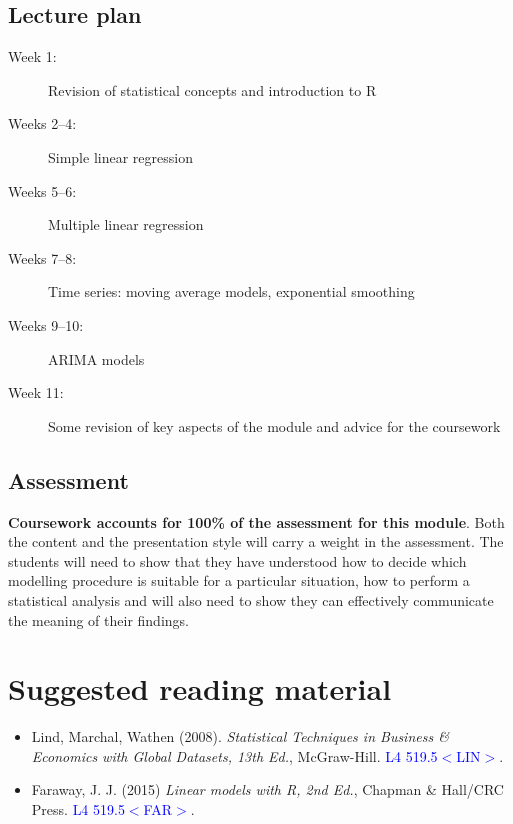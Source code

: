 \documentclass[12pt,a4paper,openany,twoside]{report}
\newcommand{\blue}{\textcolor{blue}}
\renewcommand{\emph}[1]{\textcolor{Emerald}{\textit{#1}}}
\theoremstyle{definition}
\theoremstyle{remark}
\theoremstyle{plain}
\theoremstyle{definition}
\theoremstyle{definition}
\theoremstyle{definition}
\theoremstyle{remark}
\begin{document}
\hypertarget{lecture-plan}{%
\subsection*{Lecture plan}\label{lecture-plan}}

\begin{description}
\item[Week 1:]  Revision of statistical concepts and introduction to R
\item[Weeks 2--4:] Simple linear regression 
\item[Weeks 5--6:] Multiple linear regression 
\item[Weeks 7--8:] Time series:  moving average models, exponential smoothing 
\item[Weeks 9--10:] ARIMA models
\item[Week 11:]  Some revision of key aspects of the module and advice for the coursework  
\end{description}

\hypertarget{assessment}{%
\subsection*{Assessment}\label{assessment}}

\textbf{Coursework accounts for 100\% of the assessment for this module}. Both the content and the presentation style will carry a weight in the
assessment. The students will need to show that they have understood how to decide which modelling procedure is suitable for a particular situation, how to perform a
statistical analysis and will also need to show they can effectively communicate the meaning of their findings.

\hypertarget{suggested-reading-material}{%
\section*{Suggested reading material}\label{suggested-reading-material}}

\begin{itemize}
\item
  Lind, Marchal, Wathen (2008). \emph{Statistical Techniques in Business \& Economics with Global Datasets, 13th Ed.}, McGraw-Hill. \blue{L4 519.5$<$LIN$>$}.
\item
  Faraway, J. J. (2015) \emph{Linear models with R, 2nd Ed.}, Chapman \& Hall/CRC
  Press. \blue{L4 519.5$<$FAR$>$}.
\end{itemize}
\end{document}
